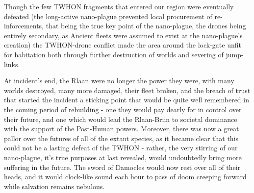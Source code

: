 Though the few TWHON fragments that entered our region were eventually
defeated (the long-active nano-plague prevented local procurement of
re-inforcements, that being the true key point of the nano-plague, the
drones being entirely secondary, as Ancient fleets were assumed to
exist at the nano-plague's creation) the TWHON-drone conflict made the
area around the lock-gate unfit for habitation both through further
destruction of worlds and severing of jump-links.

At incident's end, the Rlaan were no longer the power they were, with
many worlds destroyed, many more damaged, their fleet broken, and the
breach of trust that started the incident a sticking point that would
be quite well remembered in the coming period of rebuilding - one they
would pay dearly for in control over their future, and one which would
lead the Rlaan-Briin to societal dominance with the support of the
Post-Human powers. Moreover, there was now a great pallor over the
futures of all of the extant species, as it became clear that this
could not be a lasting defeat of the TWHON - rather, the very stirring
of our nano-plague, it's true purposes at last revealed, would
undoubtedly bring more suffering in the future. The sword of Damocles
would now rest over all of their heads, and it would clock-like sound
each hour to pass of doom creeping forward while salvation remains
nebulous.



